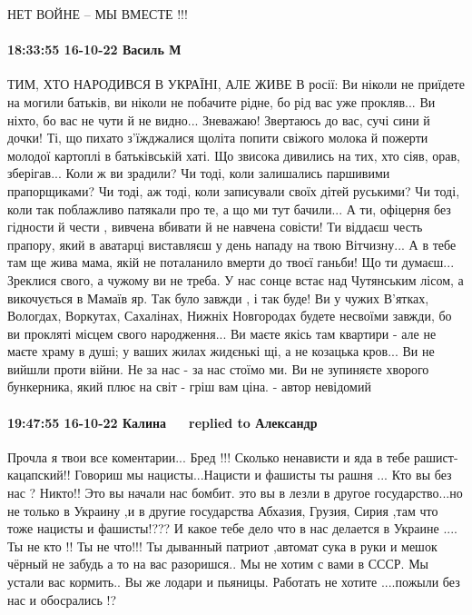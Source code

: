НЕТ ВОЙНЕ – МЫ ВМЕСТЕ !!!

\paragraph{18:33:55 16-10-22 Василь М}

ТИМ, ХТО НАРОДИВСЯ В УКРАЇНІ, АЛЕ ЖИВЕ В росії:
Ви ніколи не приїдете на могили батьків, ви ніколи не побачите рідне, бо рід вас уже прокляв... Ви ніхто, бо вас не чути й не видно... Зневажаю!
Звертаюсь до вас, сучі сини й дочки! Ті, що пихато з'їжджалися щоліта попити свіжого молока й пожерти молодої картоплі в батьківській хаті. Що звисока дивились на тих, хто сіяв, орав, зберігав...
Коли ж ви зрадили? Чи тоді, коли залишались паршивими прапорщиками? Чи тоді, аж тоді, коли записували своїх дітей руськими? Чи тоді, коли так поблажливо патякали про те, а що ми тут бачили...
А ти, офіцерня без гідности й чести , вивчена вбивати й не навчена совісти! Ти віддаєш честь прапору, який в аватарці виставляєш у день нападу на твою Вітчизну... А в тебе там ще жива мама, якій не поталанило вмерти до твоєї ганьби! Що ти думаєш...
Зреклися свого, а чужому ви не треба.
У нас сонце встає над Чутянським лісом, а викочується в Мамаїв яр. Так було завжди , і так буде! Ви у чужих В'ятках, Вологдах, Воркутах, Сахалінах, Нижніх Новгородах будете несвоїми завжди, бо ви прокляті місцем свого народження... Ви маєте якісь там квартири - але не маєте храму в душі; у ваших жилах жидєнькі щі, а не козацька кров...
Ви не вийшли проти війни. Не за нас - за нас стоїмо ми. Ви не зупиняєте хворого бункерника, який плює на світ - гріш вам ціна.
- автор невідомий

\paragraph{19:47:55 16-10-22 Калина 🌻🌻🌻🌻🌻replied to Александр}

Прочла я твои все коментарии...
Бред !!!
Сколько ненависти и яда в тебе рашист-кацапский!!
Говориш мы нацисты...Нацисти и фашисты ты рашня ...
Кто вы без нас ?
Никто!!
Это вы начали нас бомбит. это вы в лезли в другое государство...но не только в Украину ,и в другие государства Абхазия, Грузия, Сирия ,там что тоже нацисты и фашисты!???
И какое тебе дело что в нас делается в Украине ....
Ты не кто !!
Ты не что!!!
Ты дыванный патриот ,автомат сука в руки
и мешок чёрный не забудь а то на вас разоришся..
Мы не хотим с вами в СССР.
Мы устали вас кормить..
Вы же лодари и пьяницы.
Работать не хотите ....пожыли без нас и обосрались !?

